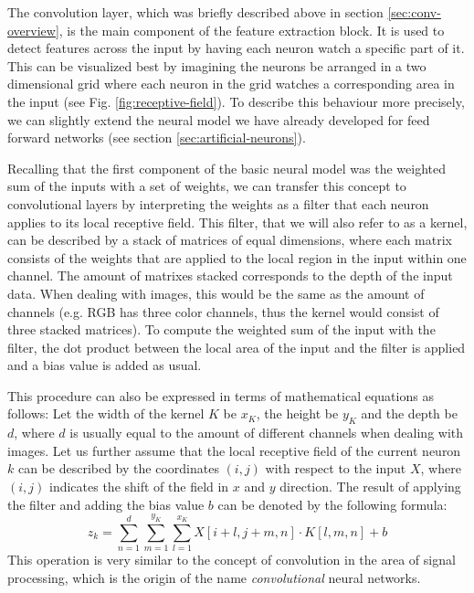 The convolution layer, which was briefly described above in section
\ref{sec:conv-overview}, is the main
component of the feature extraction block. It is used to detect
features across the input by having each neuron watch a specific part
of it. This can be visualized best by imagining the neurons be
arranged in a two dimensional grid where each neuron in the grid
watches a corresponding area in the input (see
Fig. \ref{fig:receptive-field}). To describe
this behaviour more precisely, we can slightly extend the neural model
we have already developed for feed forward networks (see section
\ref{sec:artificial-neurons}).

Recalling that the first component of the basic neural model was the
weighted sum of the inputs with a set of weights, we can transfer this
concept to convolutional layers by interpreting the weights as a
filter that each neuron applies to its local receptive field. This
filter, that we will also refer to as a kernel, can be described by a
stack of matrices of equal dimensions, where each matrix consists of
the weights that are applied to the local region in the input within
one channel. The amount of matrixes stacked corresponds to the depth
of the input data. When dealing with images, this would be the same as
the amount of channels (e.g. RGB has three color channels, thus the
kernel would consist of three stacked matrices). To compute the
weighted sum of the input with the filter, the dot product between the
local area of the input and the filter is applied and a bias value is
added as usual.

This procedure can also be expressed in terms of mathematical
equations as follows: Let the width of the kernel \(K\) be \(x_K\), the
height be \(y_K\) and the depth be \(d\), where \(d\) is usually equal
to the amount of different channels when dealing with images. Let us
further assume that the local receptive field of the current neuron
\(k\) can be described by the coordinates \((i, j)\) with respect to
the input \(X\), where \((i, j)\) indicates the shift of the field in
\(x\) and \(y\) direction. The result of applying the filter and
adding the bias value \(b\) can be denoted by the following formula:
\begin{equation}
  \label{Eq:convolution}
  z_k = \sum_{n=1}^{d}{\sum_{m=1}^{y_K}{\sum_{l=1}^{x_K}{X[i+l, j+m, n] \cdot
        K[l, m, n]}}} + b
\end{equation}
This operation is very similar to the concept of convolution in the
area of signal processing, which is the origin of the name
\textit{convolutional} neural networks.

